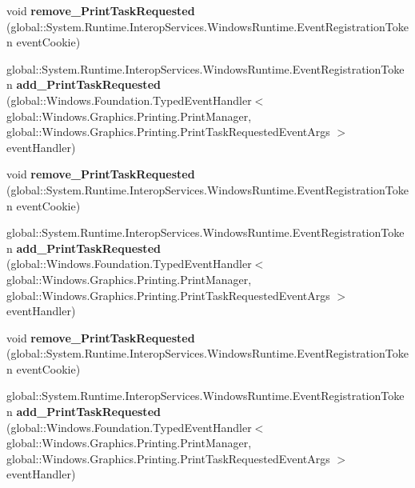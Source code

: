 \begin{DoxyCompactItemize}
void {\bfseries remove\+\_\+\+Print\+Task\+Requested} (global\+::\+System.\+Runtime.\+Interop\+Services.\+Windows\+Runtime.\+Event\+Registration\+Token event\+Cookie)
\item 
\mbox{\label{interface_windows_1_1_graphics_1_1_printing_1_1_i_print_manager_a3847e13f6319e169ee1b0cad46349d55}} 
global\+::\+System.\+Runtime.\+Interop\+Services.\+Windows\+Runtime.\+Event\+Registration\+Token {\bfseries add\+\_\+\+Print\+Task\+Requested} (global\+::\+Windows.\+Foundation.\+Typed\+Event\+Handler$<$ global\+::\+Windows.\+Graphics.\+Printing.\+Print\+Manager, global\+::\+Windows.\+Graphics.\+Printing.\+Print\+Task\+Requested\+Event\+Args $>$ event\+Handler)
\item 
\mbox{\label{interface_windows_1_1_graphics_1_1_printing_1_1_i_print_manager_a9fc2ea04a3aea1a103a829815f1cbc9d}} 
void {\bfseries remove\+\_\+\+Print\+Task\+Requested} (global\+::\+System.\+Runtime.\+Interop\+Services.\+Windows\+Runtime.\+Event\+Registration\+Token event\+Cookie)
\item 
\mbox{\label{interface_windows_1_1_graphics_1_1_printing_1_1_i_print_manager_a3847e13f6319e169ee1b0cad46349d55}} 
global\+::\+System.\+Runtime.\+Interop\+Services.\+Windows\+Runtime.\+Event\+Registration\+Token {\bfseries add\+\_\+\+Print\+Task\+Requested} (global\+::\+Windows.\+Foundation.\+Typed\+Event\+Handler$<$ global\+::\+Windows.\+Graphics.\+Printing.\+Print\+Manager, global\+::\+Windows.\+Graphics.\+Printing.\+Print\+Task\+Requested\+Event\+Args $>$ event\+Handler)
\item 
\mbox{\label{interface_windows_1_1_graphics_1_1_printing_1_1_i_print_manager_a9fc2ea04a3aea1a103a829815f1cbc9d}} 
void {\bfseries remove\+\_\+\+Print\+Task\+Requested} (global\+::\+System.\+Runtime.\+Interop\+Services.\+Windows\+Runtime.\+Event\+Registration\+Token event\+Cookie)
\item 
\mbox{\label{interface_windows_1_1_graphics_1_1_printing_1_1_i_print_manager_a3847e13f6319e169ee1b0cad46349d55}} 
global\+::\+System.\+Runtime.\+Interop\+Services.\+Windows\+Runtime.\+Event\+Registration\+Token {\bfseries add\+\_\+\+Print\+Task\+Requested} (global\+::\+Windows.\+Foundation.\+Typed\+Event\+Handler$<$ global\+::\+Windows.\+Graphics.\+Printing.\+Print\+Manager, global\+::\+Windows.\+Graphics.\+Printing.\+Print\+Task\+Requested\+Event\+Args $>$ event\+Handler)

\end{DoxyCompactItemize}
